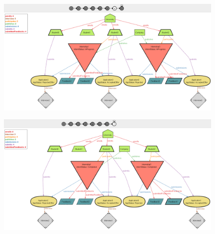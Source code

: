 \begin{figure}
    \centering
    \includegraphics[width=1\textwidth]{Images/Alloy/dyn7.png}\label{fig:dyn7}
\end{figure}
\begin{figure}
    \centering
    \includegraphics[width=1\textwidth]{Images/Alloy/dyn8.png}\label{fig:dyn8}
\end{figure}